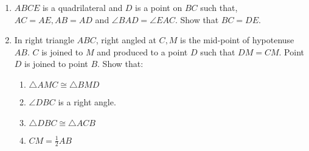 \begin{enumerate}[label=\thesection.\arabic*.,ref=\thesection.\theenumi]
\item $ABCE$ is a quadrilateral and $D$ is a point on $BC$ such that, $AC = AE, AB = AD$ and $\angle  BAD = \angle  EAC$. Show that $BC = DE$.
%
\item In right triangle $ABC$, right angled at $C, M$ is the mid-point of hypotenuse $AB$. $C$ is joined to $M$ and produced to a point $D$ such that $DM = CM$. Point $D$ is joined to point $B$.
Show that: 
\begin{enumerate}
\item $ \triangle  AMC \cong  \triangle  BMD $
\item $\angle  DBC$ is a right angle. 
\item $\triangle  DBC \cong  \triangle  ACB$
\item $ CM = \frac{1}{ 2} AB$
\end{enumerate}
%
%
%


\end{enumerate}
